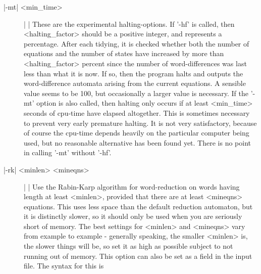 \begin{description}
\item[|-mt| <min\_time>]| |\newline
These are the experimental halting-options. If '-hf' is called, then
<halting\_factor> should be a positive integer, and represents a percentage.
After each tidying, it is checked whether both the number of
equations and the number of states have increased by more than
<halting\_factor> percent since the number of word-differences was last
less than what it is now.
If so, then the program halts and outputs the
word-difference automata arising from the current equations. A sensible value
seems to be 100, but occasionally a larger value is necessary. If the
'-mt' option is also called, then halting only occurs if at least <min\_time>
seconds of cpu-time have elapsed altogether.
This is sometimes necessary to prevent very early premature halting.
It is not very satisfactory, because of course the cpu-time
depends heavily on the particular computer being used, but no reasonable
alternative has been found yet.
There is no point in calling '-mt' without '-hf'.
\item[|-rk| <minlen> <mineqns>] | |\newline
Use the Rabin-Karp algorithm for word-reduction on words having length at least
<minlen>, provided that there are at least <mineqns> equations.
This uses less space than the default reduction automaton, but it is
distinctly slower, so it should only be used when you are seriously short of
memory.
The best settings for <minlen> and <mineqns> vary from example to
example - generally speaking, the smaller <minlen> is, the slower things
will be, so set it as high as possible subject to not running out of memory.
This option can also be set as a field in the input file.
The syntax for this is


\end{description}
